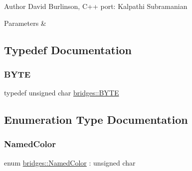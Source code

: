 \begin{DoxyAuthor}{Author}
David Burlinson, C++ port\+: Kalpathi Subramanian 
\end{DoxyAuthor}

\begin{DoxyParams}{Parameters}
{\em } & \\
\hline
\end{DoxyParams}


\subsection{Typedef Documentation}
\mbox{\label{namespacebridges_a59b77ee45243ba85c701fb8ab298ef00}} 
\subsubsection{\texorpdfstring{BYTE}{BYTE}}
{\footnotesize\ttfamily typedef unsigned char \mbox{\hyperlink{namespacebridges_a59b77ee45243ba85c701fb8ab298ef00}{bridges\+::\+B\+Y\+TE}}}



\subsection{Enumeration Type Documentation}
\mbox{\label{namespacebridges_ad811207d8898a7fd6b72a74725e68357}} 
\subsubsection{\texorpdfstring{NamedColor}{NamedColor}}
{\footnotesize\ttfamily enum \mbox{\hyperlink{namespacebridges_ad811207d8898a7fd6b72a74725e68357}{bridges\+::\+Named\+Color}} \+: unsigned char\hspace{0.3cm}{\ttfamily [strong]}}

